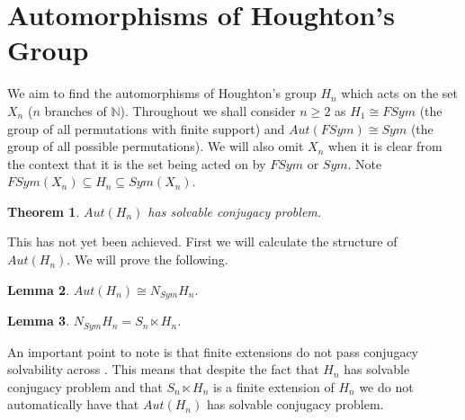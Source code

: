 \documentclass[a4paper,10pt]{article}
\newcommand{\N}{\mathbb{N}}
\theoremstyle{plain}%
\newtheorem{thm}{Theorem}[section]
\newtheorem{lem}[thm]{Lemma}
\theoremstyle{definition}
\theoremstyle{remark}
\begin{document}
\section{Automorphisms of Houghton's Group}
We aim to find the automorphisms of Houghton's group $H_n$ which acts on the set $X_n$ ($n$ branches of $\N$). Throughout we shall consider $n \ge 2$ as $H_1 \cong FSym$ (the group of all permutations with finite support)
and $Aut(FSym) \cong Sym$ (the group of all possible permutations). We will also omit $X_n$ when it is clear from the context that it is the set being acted on by $FSym$  or
$Sym$. Note $FSym(X_n) \subseteq H_n \subseteq Sym(X_n)$.
\begin{thm} $Aut(H_n)$ has solvable conjugacy problem.
\end{thm}
This has not yet been achieved. First we will calculate the structure of $Aut(H_n)$. We will prove the following.
\begin{lem}\label{1}
$Aut(H_n) \cong N_{Sym}H_n.$
\end{lem}
\begin{lem}\label{2}
$N_{Sym}H_n = S_n \ltimes H_n$.
\end{lem}
An important point to note is that finite extensions do not pass conjugacy solvability across \cite{Gorjaga1975}. This means that despite the fact that $H_n$
has solvable conjugacy problem \cite{ConjHou} and that $S_n \ltimes H_n$ is a finite extension of $H_n$ we do not automatically
have that $Aut(H_n)$ has solvable conjugacy problem.
\end{document}
